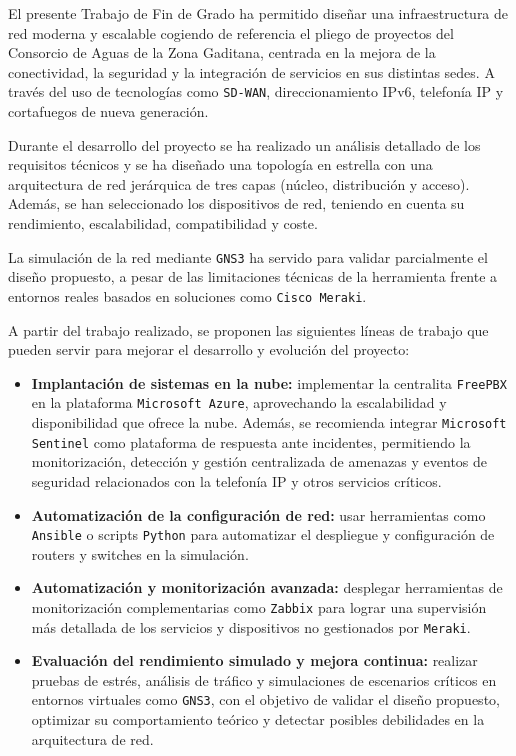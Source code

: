 El presente Trabajo de Fin de Grado ha permitido diseñar una infraestructura de red moderna y escalable cogiendo de referencia el pliego de proyectos del Consorcio de Aguas de la Zona Gaditana, centrada en la mejora de la conectividad, la seguridad y la integración de servicios en sus distintas sedes. A través del uso de tecnologías como \texttt{SD-WAN}, direccionamiento IPv6, telefonía IP y cortafuegos de nueva generación.

\vspace{0.5cm}
Durante el desarrollo del proyecto se ha realizado un análisis detallado de los requisitos técnicos y se ha diseñado una topología en estrella con una arquitectura de red jerárquica de tres capas (núcleo, distribución y acceso). Además, se han seleccionado los dispositivos de red, teniendo en cuenta su rendimiento, escalabilidad, compatibilidad y coste.

\vspace{0.5cm}
La simulación de la red mediante \texttt{GNS3} ha servido para validar parcialmente el diseño propuesto, a pesar de las limitaciones técnicas de la herramienta frente a entornos reales basados en soluciones como \texttt{Cisco Meraki}. 

\vspace{0.5cm}
A partir del trabajo realizado, se proponen las siguientes líneas de trabajo que pueden servir para mejorar el desarrollo y evolución del proyecto:
\begin{itemize}
  \item \textbf{Implantación de sistemas en la nube:} implementar la centralita \texttt{FreePBX} en la plataforma \texttt{Microsoft Azure}, aprovechando la escalabilidad y disponibilidad que ofrece la nube. Además, se recomienda integrar \texttt{Microsoft Sentinel} como plataforma de respuesta ante incidentes, permitiendo la monitorización, detección y gestión centralizada de amenazas y eventos de seguridad relacionados con la telefonía IP y otros servicios críticos.

  \item \textbf{Automatización de la configuración de red:} usar herramientas como \texttt{Ansible} o scripts \texttt{Python} para automatizar el despliegue y configuración de routers y switches en la simulación.

  \item \textbf{Automatización y monitorización avanzada:} desplegar herramientas de monitorización complementarias como \texttt{Zabbix} para lograr una supervisión más detallada de los servicios y dispositivos no gestionados por \texttt{Meraki}.

  \item \textbf{Evaluación del rendimiento simulado y mejora continua:} realizar pruebas de estrés, análisis de tráfico y simulaciones de escenarios críticos en entornos virtuales como \texttt{GNS3}, con el objetivo de validar el diseño propuesto, optimizar su comportamiento teórico y detectar posibles debilidades en la arquitectura de red.
\end{itemize}